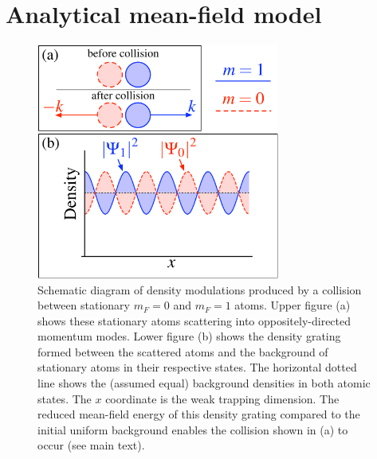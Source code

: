 \section{Analytical mean-field model}


\begin{figure}
    \begin{center}
        \includegraphics[width=8cm]{CollisionDiagram}
        \caption{Schematic diagram of density modulations produced by a collision
                 between stationary $m_F=0$ and $m_F=1$ atoms. Upper figure (a)
                 shows these stationary atoms scattering into oppositely-directed
                 momentum modes. Lower figure (b) shows the density grating formed
                 between the scattered atoms and the background of stationary atoms
                 in their respective states. The horizontal dotted line shows the
                 (assumed equal) background densities in both atomic states. The $x$
                 coordinate is the weak trapping dimension. The reduced mean-field
                 energy of this density grating compared to the initial uniform
                 background enables the collision shown in (a) to occur (see main
                 text).
                 \label{Peaks:CollisionDiagram}}
    \end{center}
\end{figure}

